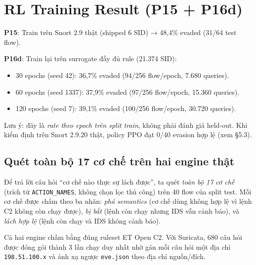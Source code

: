\documentclass[12pt, a4paper, openany]{book}
\begin{document}
\section{RL Training Result (P15 + P16d)}

\textbf{P15}: Train trên Snort 2.9 thật (shipped 6 SID) → 48,4\% evaded (31/64 test flow).

\textbf{P16d}: Train lại trên surrogate đầy đủ rule (21.374 SID):
\begin{itemize}
    \item 30 epochs (seed 42): 36,7\% evaded (94/256 flow/epoch, 7.680 queries).
    \item 60 epochs (seed 1337): 37,9\% evaded (97/256 flow/epoch, 15.360 queries).
    \item 120 epochs (seed 7): 39,1\% evaded (100/256 flow/epoch, 30.720 queries).
\end{itemize}
Lưu ý: đây là \emph{rate theo epoch trên split train}, không phải đánh giá held-out. Khi kiểm định trên Snort 2.9.20 thật, policy PPO đạt 0/40 evasion hợp lệ (xem §5.3).

\subsection*{Quét toàn bộ 17 cơ chế trên hai engine thật}

Để trả lời câu hỏi ``cơ chế nào thực sự lách được'', ta quét \emph{toàn bộ 17 cơ chế}
(trích từ \texttt{ACTION\_NAMES}, không chọn lọc thủ công) trên 40 flow của split test.
Mỗi cơ chế được chấm theo ba nhãn: \emph{phá semantics} (cơ chế dùng không hợp lệ vì
lệnh C2 không còn chạy được), \emph{bị bắt} (lệnh còn chạy nhưng IDS vẫn cảnh báo),
và \emph{lách hợp lệ} (lệnh còn chạy và IDS không cảnh báo).

Cả hai engine chấm bằng đúng ruleset ET Open C2. Với Suricata, 680 câu hỏi được đóng
gói thành 3 lần chạy duy nhất nhờ gán mỗi câu hỏi một địa chỉ \texttt{198.51.100.x}
và ánh xạ ngược \texttt{eve.json} theo địa chỉ nguồn/đích.
\end{document}

